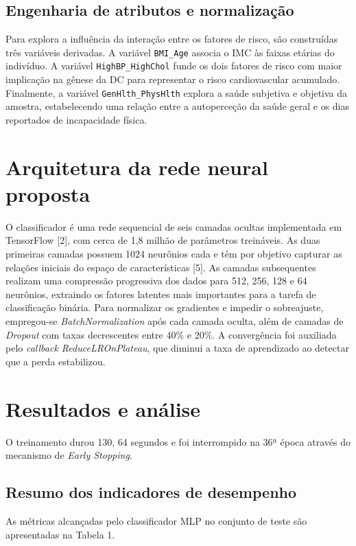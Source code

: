 \documentclass[
    12pt,
    article,
    oneside,
    a4paper,
    english,
    brazil
]{abntex2}
\begin{document}
\subsection{Engenharia de atributos e normalização}\label{engenharia-de-atributos-e-normalizauxe7uxe3o}
Para explora a influência da interação entre os fatores de risco, são construídas três variáveis derivadas. A variável \texttt{BMI\_Age} associa o IMC às faixas etárias do indivíduo. A variável \texttt{HighBP\_HighChol} funde os dois fatores de risco com maior implicação na gênese da DC para representar o risco cardiovascular acumulado. Finalmente, a variável \texttt{GenHlth\_PhysHlth} explora a saúde subjetiva e objetiva da amostra, estabelecendo uma relação entre a autoperceção da saúde geral e os dias reportados de incapacidade física.

\section{Arquitetura da rede neural proposta}\label{arquitetura-da-rede-neural-proposta}
O classificador é uma rede sequencial de seis camadas ocultas implementada em TensorFlow [2], com cerca de 1,8 milhão de parâmetros treináveis. As duas primeiras camadas possuem 1024 neurônios cada e têm por objetivo capturar as relações iniciais do espaço de características [5]. As camadas subsequentes realizam uma compressão progressiva dos dados para 512, 256, 128 e 64 neurônios, extraindo os fatores latentes mais importantes para a tarefa de classificação binária. Para normalizar os gradientes e impedir o sobreajuste, empregou-se \emph{BatchNormalization} após cada camada oculta, além de camadas de \emph{Dropout} com taxas decrescentes entre 40\% e 20\%. A convergência foi auxiliada pelo \emph{callback ReduceLROnPlateau}, que diminui a taxa de aprendizado ao detectar que a perda estabilizou.

\section{Resultados e análise}\label{resultados-e-anuxe1lise}
O treinamento durou 130, 64 segundos e foi interrompido na 36ª época através do mecanismo de \emph{Early Stopping}.

\subsection{Resumo dos indicadores de desempenho}\label{resumo-dos-indicadores-de-desempenho}
As métricas alcançadas pelo classificador MLP no conjunto de teste são apresentadas na Tabela 1.
\end{document}
